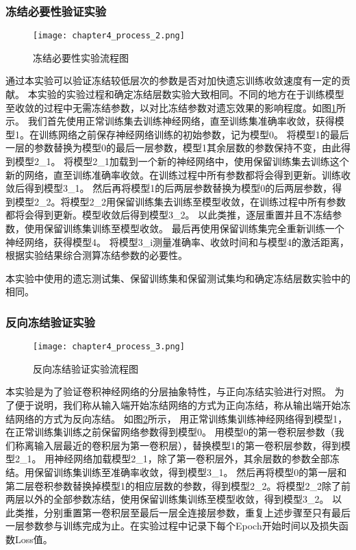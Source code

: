 \subsubsection{冻结必要性验证实验}
\begin{figure}
    \centering
    \texttt{[image: chapter4\_process\_2.png]}
    \caption{冻结必要性实验流程图}
    \label{fig:chapter4_process_2}
\end{figure}

通过本实验可以验证冻结较低层次的参数是否对加快遗忘训练收敛速度有一定的贡献。
本实验的实验过程和确定冻结层数实验大致相同。不同的地方在于训练模型至收敛的过程中无需冻结参数，以对比冻结参数对遗忘效果的影响程度。如图\ref{fig:chapter4_process_2}所示。
我们首先使用正常训练集去训练神经网络，直至训练集准确率收敛，获得模型1。在训练网络之前保存神经网络训练的初始参数，记为模型0。
将模型1的最后一层的参数替换为模型0的最后一层参数，模型1其余层数的参数保持不变，由此得到模型2\_1。
将模型2\_1加载到一个新的神经网络中，使用保留训练集去训练这个新的网络，直至训练准确率收敛。在训练过程中所有参数都将会得到更新。训练收敛后得到模型3\_1。
然后再将模型1的后两层参数替换为模型0的后两层参数，得到模型2\_2。将模型2\_2用保留训练集去训练至模型收敛，在训练过程中所有参数都将会得到更新。模型收敛后得到模型3\_2。
以此类推，逐层重置并且不冻结参数，使用保留训练集训练至模型收敛。
最后再使用保留训练集完全重新训练一个神经网络，获得模型4。
将模型3\_i测量准确率、收敛时间和与模型4的激活距离，根据实验结果综合测算冻结参数的必要性。

本实验中使用的遗忘测试集、保留训练集和保留测试集均和确定冻结层数实验中的相同。

\subsubsection{反向冻结验证实验}
\begin{figure}
    \centering
    \texttt{[image: chapter4\_process\_3.png]}
    \caption{反向冻结验证实验流程图}
    \label{fig:chapter4_process_3}
\end{figure}

本实验是为了验证卷积神经网络的分层抽象特性，与正向冻结实验进行对照。
为了便于说明，我们称从输入端开始冻结网络的方式为正向冻结，称从输出端开始冻结网络的方式为反向冻结。
如图\ref{fig:chapter4_process_3}所示，
用正常训练集训练神经网络得到模型1，在正常训练集训练之前保留网络参数得到模型0。
用模型0的第一卷积层参数（我们称离输入层最近的卷积层为第一卷积层），替换模型1的第一卷积层参数，得到模型2\_1。
用神经网络加载模型2\_1，除了第一卷积层外，其余层数的参数全部冻结。用保留训练集训练至准确率收敛，得到模型3\_1。
然后再将模型0的第一层和第二层卷积参数替换掉模型1的相应层数的参数，得到模型2\_2。将模型2\_2除了前两层以外的全部参数冻结，使用保留训练集训练至模型收敛，得到模型3\_2。
以此类推，分别重置第一卷积层至最后一层全连接层参数，重复上述步骤至只有最后一层参数参与训练完成为止。在实验过程中记录下每个Epoch开始时间以及损失函数Loss值。

